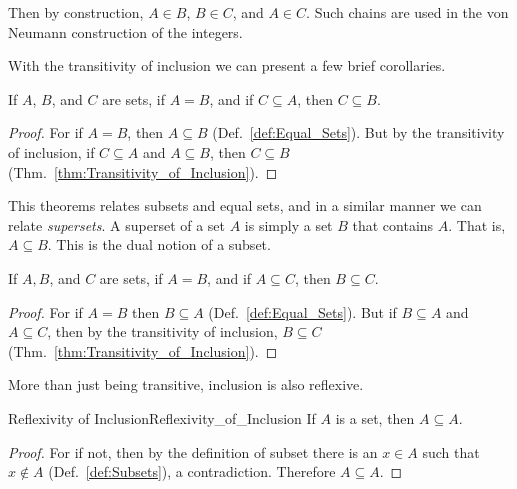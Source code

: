         \par\vspace{2.5ex}
        Then by construction, $A\in{B}$, $B\in{C}$, and $A\in{C}$. Such chains
        are used in the von Neumann construction of the
        integers.
        \par\hfill\par
        With the transitivity of inclusion we can present a few brief
        corollaries.
        \begin{theorem}
            \label{thm:Subsets_of_Equal_Sets}%
            If $A$, $B$, and $C$ are sets, if $A=B$, and if $C\subseteq{A}$,
            then $C\subseteq{B}$.
        \end{theorem}
        \begin{proof}
            For if $A=B$, then $A\subseteq{B}$ (Def.~\ref{def:Equal_Sets}). But
            by the transitivity of inclusion, if $C\subseteq{A}$ and
            $A\subseteq{B}$, then $C\subseteq{B}$
            (Thm.~\ref{thm:Transitivity_of_Inclusion}).
        \end{proof}
        This theorems relates subsets and equal sets, and in a similar manner
        we can relate \textit{supersets}. A superset of a set $A$ is simply a
        set $B$ that contains $A$. That is, $A\subseteq{B}$. This is the dual
        notion of a subset.
        \begin{theorem}
            \label{thm:Superset_of_Equal_Sets}%
            If $A,B$, and $C$ are sets, if $A=B$, and if $A\subseteq{C}$, then
            $B\subseteq{C}$.
        \end{theorem}
        \begin{proof}
            For if $A=B$ then $B\subseteq{A}$ (Def.~\ref{def:Equal_Sets}).
            But if $B\subseteq{A}$ and $A\subseteq{C}$, then by the transitivity
            of inclusion, $B\subseteq{C}$
            (Thm.~\ref{thm:Transitivity_of_Inclusion}).
        \end{proof}
        More than just being transitive, inclusion is also reflexive.
        \begin{ltheorem}{Reflexivity of Inclusion}{Reflexivity_of_Inclusion}
            If $A$ is a set, then $A\subseteq{A}$.
        \end{ltheorem}
        \begin{proof}
            For if not, then by the definition of subset there is an $x\in{A}$
            such that $x\notin{A}$ (Def.~\ref{def:Subsets}), a contradiction.
            Therefore $A\subseteq{A}$.
        \end{proof}
